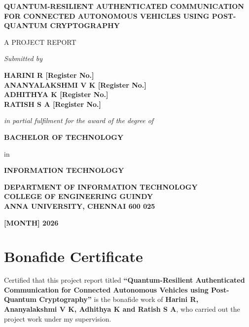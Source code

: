 \documentclass[12pt,a4paper,oneside]{report}
\newcommand{\projtitle}{Quantum-Resilient Authenticated Communication for Connected Autonomous Vehicles using Post-Quantum Cryptography}
\begin{document}
\begin{titlepage}
\centering
{\large\bfseries\MakeUppercase{\projtitle}\par}
\vspace{1.4cm}
{\normalsize A PROJECT REPORT\par}
\vspace{0.6cm}
{\normalsize\itshape Submitted by\par}
\vspace{0.3cm}
{\bfseries
HARINI R \hfill [Register No.]\\
ANANYALAKSHMI V K \hfill [Register No.]\\
ADHITHYA K \hfill [Register No.]\\
RATISH S A \hfill [Register No.]\par}
\vspace{0.8cm}
{\normalsize\itshape in partial fulfilment for the award of the degree of\par}
\vspace{0.3cm}
{\bfseries BACHELOR OF TECHNOLOGY\par}
{\normalsize in\par}
{\bfseries INFORMATION TECHNOLOGY\par}
\vfill
{\bfseries DEPARTMENT OF INFORMATION TECHNOLOGY\\
COLLEGE OF ENGINEERING GUINDY\\
ANNA UNIVERSITY, CHENNAI 600 025\par}
\vspace{0.4cm}
{\bfseries [MONTH] 2026\par}
\end{titlepage}

\chapter*{Bonafide Certificate}
Certified that this project report titled \textbf{``\projtitle''} is the bonafide
work of \textbf{Harini R, Ananyalakshmi V K, Adhithya K and Ratish S A}, who
carried out the project work under my supervision.
\end{document}
